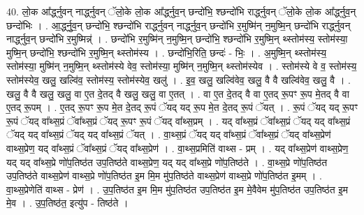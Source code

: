 \documentclass[17pt]{extarticle}
\begin{document}
40. लो॒क आ᳚र्द्ध्नुवन् नार्द्ध्नुवन् ॅलो॒के लो॒क आ᳚र्द्ध्नुव॒न् छन्दो॑भि॒ श्छन्दो॑भि रार्द्ध्नुवन् ॅलो॒के लो॒क आ᳚र्द्ध्नुव॒न् छन्दो॑भिः । . आ॒र्द्ध्नु॒व॒न् छन्दो॑भि॒ श्छन्दो॑भि रार्द्ध्नुवन् नार्द्ध्नुव॒न् छन्दो॑भि र॒मुष्मि॑न् न॒मुष्मि॒न् छन्दो॑भि रार्द्ध्नुवन् नार्द्ध्नुव॒न् छन्दो॑भि र॒मुष्मिन्न्॑ । . छन्दो॑भि र॒मुष्मि॑न् न॒मुष्मि॒न् छन्दो॑भि॒ श्छन्दो॑भि र॒मुष्मि॒न् थ्स्तोम॑स्य॒ स्तोम॑स्या॒ मुष्मि॒न् छन्दो॑भि॒ श्छन्दो॑भि र॒मुष्मि॒न् थ्स्तोम॑स्य । . छन्दो॑भि॒रिति॒ छन्दः॑ - भिः॒ । . अ॒मुष्मि॒न् थ्स्तोम॑स्य॒ स्तोम॑स्या॒ मुष्मि॑न् न॒मुष्मि॒न् थ्स्तोम॑स्ये वेव॒ स्तोम॑स्या॒ मुष्मि॑न् न॒मुष्मि॒न् थ्स्तोम॑स्येव । . स्तोम॑स्ये वे व॒ स्तोम॑स्य॒ स्तोम॑स्येव॒ खलु॒ खल्वि॑व॒ स्तोम॑स्य॒ स्तोम॑स्येव॒ खलु॑ । . इ॒व॒ खलु॒ खल्वि॑वेव॒ खलु॒ वै वै खल्वि॑वेव॒ खलु॒ वै । . खलु॒ वै वै खलु॒ खलु॒ वा ए॒त दे॒तद् वै खलु॒ खलु॒ वा ए॒तत् । . वा ए॒त दे॒तद् वै वा ए॒तद् रू॒पꣳ रू॒प मे॒तद् वै वा ए॒तद् रू॒पम् । . ए॒तद् रू॒पꣳ रू॒प मे॒त दे॒तद् रू॒पं ॅयद् यद् रू॒प मे॒त दे॒तद् रू॒पं ॅयत् । . रू॒पं ॅयद् यद् रू॒पꣳ रू॒पं ॅयद् वा᳚थ्स॒प्रं ॅवा᳚थ्स॒प्रं ॅयद् रू॒पꣳ रू॒पं ॅयद् वा᳚थ्स॒प्रम् । . यद् वा᳚थ्स॒प्रं ॅवा᳚थ्स॒प्रं ॅयद् यद् वा᳚थ्स॒प्रं ॅयद् यद् वा᳚थ्स॒प्रं ॅयद् यद् वा᳚थ्स॒प्रं ॅयत् । . वा॒थ्स॒प्रं ॅयद् यद् वा᳚थ्स॒प्रं ॅवा᳚थ्स॒प्रं ॅयद् वा᳚थ्स॒प्रेण॑ वाथ्स॒प्रेण॒ यद् वा᳚थ्स॒प्रं ॅवा᳚थ्स॒प्रं ॅयद् वा᳚थ्स॒प्रेण॑ । . वा॒थ्स॒प्रमिति॑ वाथ्स - प्रम् । . यद् वा᳚थ्स॒प्रेण॑ वाथ्स॒प्रेण॒ यद् यद् वा᳚थ्स॒प्रे णो॑प॒तिष्ठ॑त उप॒तिष्ठ॑ते वाथ्स॒प्रेण॒ यद् यद् वा᳚थ्स॒प्रे णो॑प॒तिष्ठ॑ते । . वा॒थ्स॒प्रे णो॑प॒तिष्ठ॑त उप॒तिष्ठ॑ते वाथ्स॒प्रेण॑ वाथ्स॒प्रे णो॑प॒तिष्ठ॑त इ॒म मि॒म मु॑प॒तिष्ठ॑ते वाथ्स॒प्रेण॑ वाथ्स॒प्रे णो॑प॒तिष्ठ॑त इ॒मम् । . वा॒थ्स॒प्रेणेति॑ वाथ्स - प्रेण॑ । . उ॒प॒तिष्ठ॑त इ॒म मि॒म मु॑प॒तिष्ठ॑त उप॒तिष्ठ॑त इ॒म मे॒वैवेम मु॑प॒तिष्ठ॑त उप॒तिष्ठ॑त इ॒म मे॒व । . उ॒प॒तिष्ठ॑त॒ इत्यु॑प - तिष्ठ॑ते । \newline
\pagebreak
{}
\end{document}
